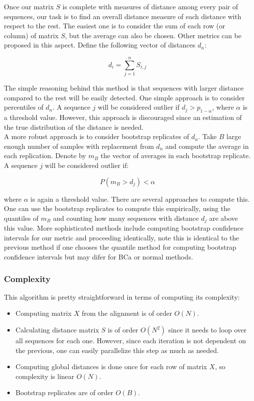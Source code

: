 \documentclass[a4paper]{llncs}
\begin{document}
Once our matrix $S$ is complete with measures of distance among every pair of sequences, our task is to find an overall distance measure of each distance with respect to the rest. The easiest one is to consider the sum of each row (or column) of matrix $S$, but the average can also be chosen. Other metrics can be proposed in this aspect. Define the following vector of distances $d_{n}$:

\begin{equation}
d_i = \sum_{j=1}^n S_{i,j}
\end{equation}


The simple reasoning behind this method is that sequences with larger distance compared to the rest will be easily detected. One simple approach is to consider percentiles of $d_n$. A sequence $j$ will be considered outlier if $d_j > p_{1-\alpha}$, where $\alpha$ is a threshold value. However, this approach is discouraged since an estimation of the true distribution of the distance is needed.\\ 

A more robust approach is to consider bootstrap replicates of $d_n$. Take $B$ large enough number of samples with replacement from $d_n$ and compute the average in each replication. Denote by $m_{B}$ the vector of averages in each bootstrap replicate. A sequence $j$ will be considered outlier if:

\begin{equation}
P\left(m_{B}>d_j\right) < \alpha
\end{equation}

where $\alpha$ is again a threshold value. There are several approaches to compute this. One can use the bootstrap replicates to compute this empirically, using the quantiles of $m_{B}$ and counting how many sequences with distance $d_j$ are above this value. More sophisticated methods include computing bootstrap confidence intervals \cite{Efron1987} for our metric and proceeding identically, note this is identical to the previous method if one chooses the quantile method for computing bootstrap confidence intervals but may difer for BCa or normal methods.

\subsubsection{Complexity}

This algorithm is pretty straightforward in terms of computing its complexity:

\begin{itemize}
\item Computing matrix $X$ from the alignment is of order $O(N)$.
\item Calculating distance matrix $S$ is of order $O(N^2)$ since it needs to loop over all sequences for each one. However, since each iteration is not dependent on the previous, one can easily parallelize this step as much as needed.
\item Computing global distances is done once for each row of matrix $X$, so complexity is linear $O(N)$.
\item Bootstrap replicates are of order $O(B)$.
\end{itemize}
\end{document}
